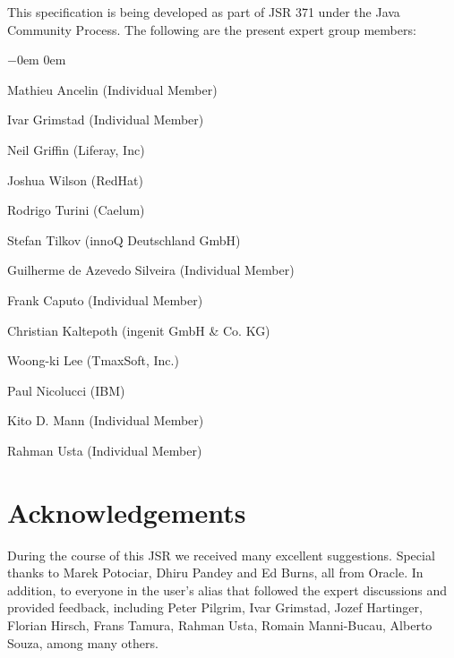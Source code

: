 This specification is being developed as part of JSR 371 under the Java Community Process. The following are the present expert
group members:

\begin{list}{$-$}{\parsep 0em  0em}
\item Mathieu Ancelin (Individual Member)
\item Ivar Grimstad (Individual Member)
\item Neil Griffin (Liferay, Inc)
\item Joshua Wilson (RedHat)
\item Rodrigo Turini (Caelum)
\item Stefan Tilkov (innoQ Deutschland GmbH)
\item Guilherme de Azevedo Silveira (Individual Member)
\item Frank Caputo (Individual Member)
\item Christian Kaltepoth (ingenit GmbH \& Co. KG)
\item Woong-ki Lee (TmaxSoft, Inc.)
\item Paul Nicolucci (IBM)
\item Kito D. Mann (Individual Member)
\item Rahman Usta (Individual Member)
\end{list}

\section{Acknowledgements}
\label{acks}

During the course of this JSR we received many excellent suggestions. Special thanks to Marek
Potociar, Dhiru Pandey and Ed Burns, all from Oracle. In addition, to everyone in the user's alias
that followed the expert discussions and provided feedback, including Peter Pilgrim, Ivar Grimstad, Jozef Hartinger, Florian Hirsch, Frans Tamura, Rahman Usta, Romain Manni-Bucau, Alberto Souza, among many others.

